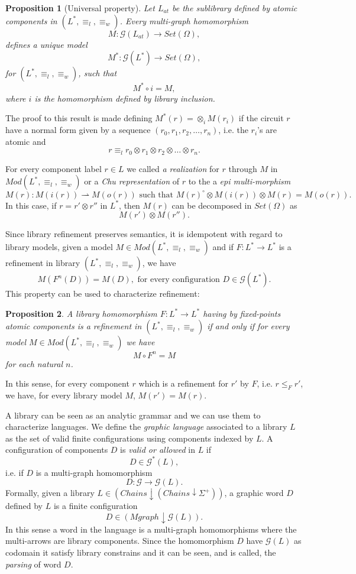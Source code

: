 \documentclass[oribibl]{llncs}
\newtheorem{prop}{Proposition}
\newcommand{\G}{\mathcal{G}}
\begin{document}
\begin{prop}[Universal property]
Let $L_{at}$ be the sublibrary defined by atomic components in ${(L^\ast,\equiv_l,\equiv_w)}$. Every multi-graph homomorphism \[M:\G(L_{at})\rightarrow Set(\Omega),\] defines a unique model \[M^\ast:\G(L^\ast)\rightarrow Set(\Omega),\] for $(L^\ast,\equiv_l,\equiv_w)$, such that \[M^\ast\circ i=M,\] where $i$ is the homomorphism defined by library inclusion.
\end{prop}

The proof to this result is made defining $M^*(r)=\otimes_iM(r_i)$ if the circuit $r$ have a normal form given by a sequence
$
(r_0,r_1,r_2,\ldots,r_n)
$, i.e. the $r_i$'s are atomic and
\[
r\equiv_l r_0\otimes r_1\otimes r_2\otimes\ldots\otimes r_n.\]

For every component label $r\in L$ we called \emph{a realization}
for $r$ through $M$ in $Mod(L^\ast,\equiv_l,\equiv_w)$ or a \emph{Chu representation} of $r$ to the a \emph{epi multi-morphism} \[M(r):M(i(r))\rightharpoonup M(o(r)) \text{ such that } M(r)^\circ\otimes M(i(r))\otimes M(r)=M(o(r)).\] In this case, if $r=
r'\otimes r''$ in $L^\ast$, then $M(r)$ can be decomposed in $Set(\Omega)$
as
\[M(r')\otimes M(r'').\]

Since library refinement preserves semantics, it is idempotent with regard to library models, given a model $M\in Mod(L^\ast,\equiv_l,\equiv_w)$ and if $F:L^\ast\rightarrow L^\ast$ is a refinement in library $(L^\ast,\equiv_l,\equiv_w)$, we have
\[
M( F^n(D))=M(D),\text{ for every configuration } D\in\G(L^\ast).
\]
This property can be used to characterize refinement:
\begin{prop}
A library homomorphism $F:L^\ast\rightarrow L^\ast$ having by fixed-points atomic components is a refinement in $(L^\ast,\equiv_l,\equiv_w)$ if and only if for every model $M\in Mod(L^\ast,\equiv_l,\equiv_w)$ we have
\[
M\circ F^n=M
\] for each natural $n$.
\end{prop}

In this sense, for every component $r$ which is a refinement for $r'$ by $F$, i.e. $r\leq_Fr'$, we have, for every library model $M$, $M(r')=M(r)$.



A library can be seen as an analytic grammar and we can use them to characterize languages. We define the \emph{graphic language} associated to a library $L$ as the set of valid finite configurations using components indexed by
$L$. A configuration of components $D$ is \emph{valid or allowed} in $L$ if
\[
D\in \G^\ast(L),
\]
i.e. if $D$ is a multi-graph homomorphism
\[D:\G\rightarrow \G(L).\] Formally, given a library $L\in (Chains\downarrow (Chains\downarrow
\Sigma^+))$, a graphic word $D$ defined by $L$ is a finite
configuration
\[D\in (Mgraph\downarrow \G(L)).\] In this sense a word in the language is a multi-graph homomorphisms where the multi-arrows are library components. Since the homomorphism $D$ have $\G(L)$ as codomain it satisfy library constrains and it can be seen, and is called, the \emph{parsing} of word $D$.
\end{document}
